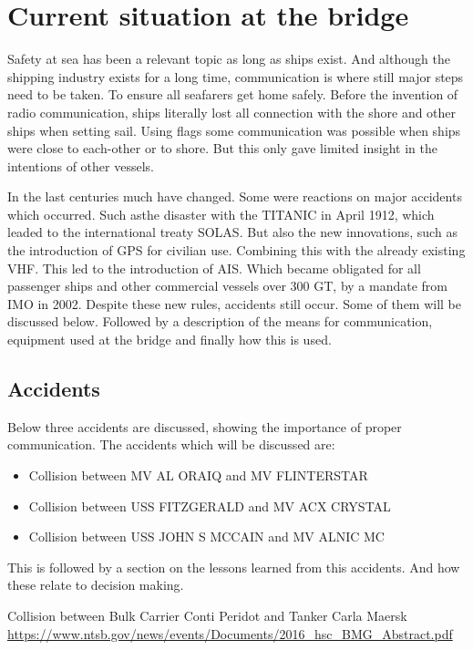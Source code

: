 \chapter{Current situation at the bridge}
Safety at sea has been a relevant topic as long as ships exist. And although the shipping industry exists for a long time, communication is where still major steps need to be taken. To ensure all seafarers get home safely. Before the invention of radio communication, ships literally lost all connection with the shore and other ships when setting sail. Using flags some communication was possible when ships were close to each-other or to shore. But this only gave limited insight in the intentions of other vessels. 

In the last centuries much have changed. Some were reactions on major accidents which occurred. Such asthe disaster with the TITANIC in April 1912, which leaded to the international treaty \ac{SOLAS}. But also the new innovations, such as the introduction of \ac{GPS} for civilian use. Combining this with the already existing \ac{VHF}. This led to the introduction of \ac{AIS}. Which became obligated for all passenger ships and other commercial vessels over 300 \ac{GT}, by a mandate from \ac{IMO} in 2002.
Despite these new rules, accidents still occur. Some of them will be discussed below. Followed by a description of the means for communication, equipment used at the bridge and finally how this is used.

\section{Accidents}
Below three accidents are discussed, showing the importance of proper communication. The accidents which will be discussed are:
\begin{itemize}
	\item Collision between MV AL ORAIQ and MV FLINTERSTAR
	\item Collision between USS FITZGERALD and MV ACX CRYSTAL
	\item Collision between USS JOHN S MCCAIN and MV ALNIC MC
\end{itemize}
This is followed by a section on the lessons learned from this accidents. And how these relate to decision making.

Collision between Bulk Carrier Conti Peridot and Tanker Carla Maersk
\url{https://www.ntsb.gov/news/events/Documents/2016_hsc_BMG_Abstract.pdf}

